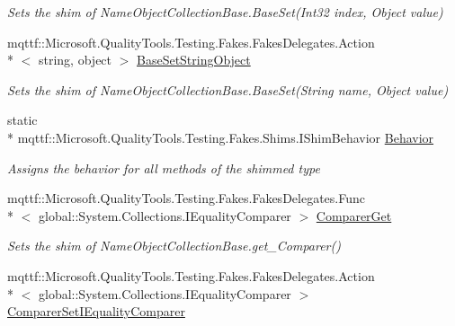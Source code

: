 \begin{DoxyCompactItemize}
\begin{DoxyCompactList}\small\item\em Sets the shim of Name\-Object\-Collection\-Base.\-Base\-Set(\-Int32 index, Object value)\end{DoxyCompactList}\item 
mqttf\-::\-Microsoft.\-Quality\-Tools.\-Testing.\-Fakes.\-Fakes\-Delegates.\-Action\\*
$<$ string, object $>$ \hyperlink{class_system_1_1_collections_1_1_specialized_1_1_fakes_1_1_shim_name_object_collection_base_afb6bca2ff77a3cace44e027e0fb6bb4d}{Base\-Set\-String\-Object}
\begin{DoxyCompactList}\small\item\em Sets the shim of Name\-Object\-Collection\-Base.\-Base\-Set(\-String name, Object value)\end{DoxyCompactList}\item 
static \\*
mqttf\-::\-Microsoft.\-Quality\-Tools.\-Testing.\-Fakes.\-Shims.\-I\-Shim\-Behavior \hyperlink{class_system_1_1_collections_1_1_specialized_1_1_fakes_1_1_shim_name_object_collection_base_addcae837064421835b36656f8a172728}{Behavior}
\begin{DoxyCompactList}\small\item\em Assigns the behavior for all methods of the shimmed type\end{DoxyCompactList}\item 
mqttf\-::\-Microsoft.\-Quality\-Tools.\-Testing.\-Fakes.\-Fakes\-Delegates.\-Func\\*
$<$ global\-::\-System.\-Collections.\-I\-Equality\-Comparer $>$ \hyperlink{class_system_1_1_collections_1_1_specialized_1_1_fakes_1_1_shim_name_object_collection_base_a39fefaf63efcc22e04b8afa7cefcd056}{Comparer\-Get}
\begin{DoxyCompactList}\small\item\em Sets the shim of Name\-Object\-Collection\-Base.\-get\-\_\-\-Comparer()\end{DoxyCompactList}\item 
mqttf\-::\-Microsoft.\-Quality\-Tools.\-Testing.\-Fakes.\-Fakes\-Delegates.\-Action\\*
$<$ global\-::\-System.\-Collections.\-I\-Equality\-Comparer $>$ \hyperlink{class_system_1_1_collections_1_1_specialized_1_1_fakes_1_1_shim_name_object_collection_base_a107b52a46ec2aed3731b1287827112f7}{Comparer\-Set\-I\-Equality\-Comparer}

\end{DoxyCompactItemize}

